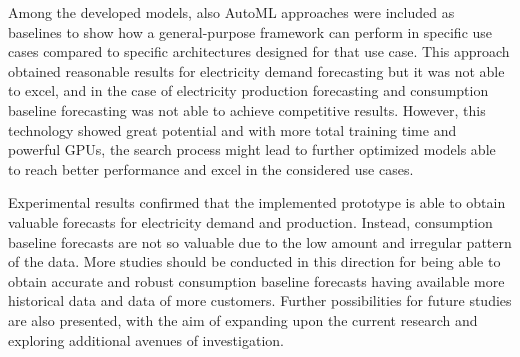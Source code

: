 Among the developed models, also AutoML approaches were included as baselines to show how a general-purpose framework can perform in specific use cases compared to specific architectures designed for that use case.
This approach obtained reasonable results for electricity demand forecasting but it was not able to excel, and in the case of electricity production forecasting and consumption baseline forecasting was not able to achieve competitive results.
However, this technology showed great potential and with more total training time and powerful GPUs, the search process might lead to further optimized models able to reach better performance and excel in the considered use cases.

Experimental results confirmed that the implemented prototype is able to obtain valuable forecasts for electricity demand and production.
Instead, consumption baseline forecasts are not so valuable due to the low amount and irregular pattern of the data.
More studies should be conducted in this direction for being able to obtain accurate and robust consumption baseline forecasts having available more historical data and data of more customers.
Further possibilities for future studies are also presented, with the aim of expanding upon the current research and exploring additional avenues of investigation.
